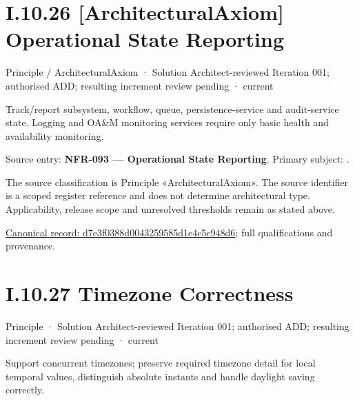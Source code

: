 \section*{I.10.26 [ArchitecturalAxiom] Operational State Reporting}
\label{navigation:I.10.26}

\label{element:d7e3f0388d0043259585d1e4c5c948d6}
{\small Principle / ArchitecturalAxiom · Solution Architect-reviewed Iteration 001; authorised ADD; resulting increment review pending · current}\par

Track/report subsystem, workflow, queue, persistence-service and audit-service state. Logging and OA\&M monitoring services require only basic health and availability monitoring.



Source entry: \textbf{NFR-093 — Operational State Reporting}. Primary subject: \texttt{}.



The source classification is Principle «ArchitecturalAxiom». The source identifier is a scoped register reference and does not determine architectural type. Applicability, release scope and unresolved thresholds remain as stated above.


{\footnotesize \href{../../../../../../../continuum/motivation/principle/architectural-axiom/d7e3f0388d0043259585d1e4c5c948d6.md}{Canonical record: d7e3f0388d0043259585d1e4c5c948d6}; full qualifications and provenance.}\par
\section*{I.10.27 Timezone Correctness}
\label{navigation:I.10.27}

\label{element:3da1fba95a00438db09c342dfba8b693}
{\small Principle · Solution Architect-reviewed Iteration 001; authorised ADD; resulting increment review pending · current}\par

Support concurrent timezones; preserve required timezone detail for local temporal values, distinguish absolute instants and handle daylight saving correctly.



